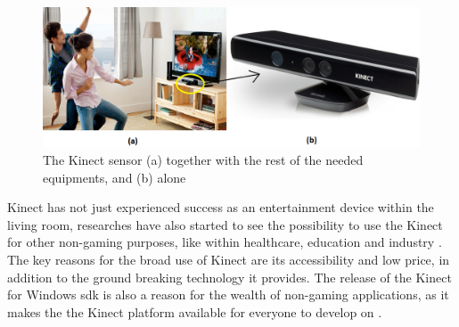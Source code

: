 \begin{figure} 
\centering
\includegraphics[scale=0.36]{sensorandtv}
\caption[The Kinect sensor]{The Kinect sensor (a) together with the rest of the needed equipments, and (b) alone}
\label{kinectsensor}
\end{figure} 
 
Kinect has not just experienced success as an entertainment device within the living room, researches have also started to see the possibility to use the Kinect for other non-gaming purposes, like within healthcare, education and industry \cite{microsoftnews}. The key reasons for the broad use of Kinect are its accessibility and low price, in addition to the ground breaking technology it provides. The release of the Kinect for Windows \ac{sdk} is also a reason for the wealth of non-gaming applications, as it makes the the Kinect platform available for everyone to develop on \cite{microsoftnews}. 

